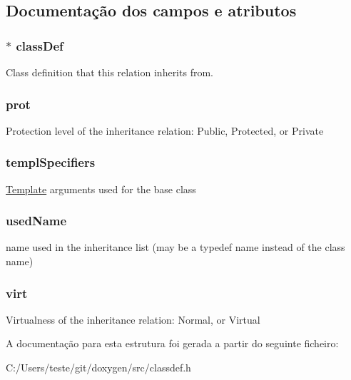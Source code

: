 \subsection{Documentação dos campos e atributos}
\hypertarget{struct_base_class_def_a9ecae2706174bc69faacb7156966b12e}{
\subsubsection[{class\-Def}]{$\ast$ class\-Def}}\label{struct_base_class_def_a9ecae2706174bc69faacb7156966b12e}
Class definition that this relation inherits from. \hypertarget{struct_base_class_def_a3f887065f93ce5f02dea21da35468e8e}{
\subsubsection[{prot}]{ prot}}\label{struct_base_class_def_a3f887065f93ce5f02dea21da35468e8e}
Protection level of the inheritance relation\-: Public, Protected, or Private \hypertarget{struct_base_class_def_aea659c4ea8200bb40a20fa289d5acc72}{
\subsubsection[{templ\-Specifiers}]{ templ\-Specifiers}}\label{struct_base_class_def_aea659c4ea8200bb40a20fa289d5acc72}
\hyperlink{class_template}{Template} arguments used for the base class \hypertarget{struct_base_class_def_a20a7352756abebcff874b7e28751d20c}{
\subsubsection[{used\-Name}]{ used\-Name}}\label{struct_base_class_def_a20a7352756abebcff874b7e28751d20c}
name used in the inheritance list (may be a typedef name instead of the class name) \hypertarget{struct_base_class_def_aa05b4729c780621416429c6aac10fccf}{
\subsubsection[{virt}]{ virt}}\label{struct_base_class_def_aa05b4729c780621416429c6aac10fccf}
Virtualness of the inheritance relation\-: Normal, or Virtual 

A documentação para esta estrutura foi gerada a partir do seguinte ficheiro\-:\begin{DoxyCompactItemize}
\item 
C\-:/\-Users/teste/git/doxygen/src/classdef.\-h\end{DoxyCompactItemize}
